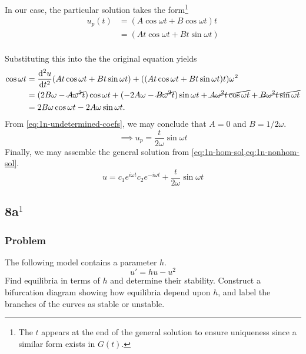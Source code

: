 \documentclass[12pt]{article}
\begin{document}
\begin{enumerate}
  In our case, the particular solution takes the form\footnote{The $t$ appears
    at the end of the general solution to ensure uniqueness since a similar form
    exists in $G(t)$.}
  \begin{equation*}
    \begin{aligned}
      u_p(t) &= (A\cos \omega t + B\cos \omega t)t \\
      &= (At\cos \omega t + Bt\sin \omega t) \\
    \end{aligned}
  \end{equation*}

  Substituting this into the the original equation yields
  \begin{equation}
    \label{eq:1n-undetermined-coefs}
    \begin{aligned}
      \cos \omega t &=
      \od[2]{u}{t}(At\cos \omega t + Bt\sin \omega t)
      + ((At\cos \omega t + Bt\sin \omega t)t)\omega^2 \\
      &= (2B\omega - \cancel{A\omega^2t})\cos\omega t
      + (-2A\omega - \cancel{B\omega^2t})\sin\omega t
      + \cancel{A\omega^2t\cos\omega t} + \cancel{B\omega^2t\sin\omega t} \\
      &= 2B\omega\cos\omega t - 2A\omega\sin\omega t.
    \end{aligned}
  \end{equation}
  From \cref{eq:1n-undetermined-coefs}, we may conclude that $A=0$ and
  $B=1/2\omega$.
  \begin{equation}
    \label{eq:1n-nonhom-sol}
    \implies u_p = \frac{t}{2\omega}\sin\omega t
  \end{equation}
  Finally, we may assemble the general solution from
  \cref{eq:1n-hom-sol,eq:1n-nonhom-sol}.
  \begin{equation*}
    \boxed{
      u = c_1e^{i\omega t}c_2e^{-i\omega t} + \frac{t}{2\omega}\sin\omega t
    }
  \end{equation*}
\end{enumerate}

\subsection{8a$^1$}
\subsubsection*{Problem}
The following model contains a parameter $h$.
\begin{equation*}
  \label{eq:8a-problem}
  u'=hu-u^2
\end{equation*}
Find equilibria in terms of $h$ and determine their stability. Construct a
bifurcation diagram showing how equilibria depend upon $h$, and label the
branches of the curves as stable or unstable.
\end{document}
